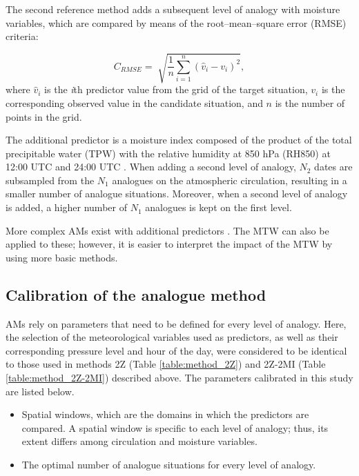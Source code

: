 \documentclass[hess, manuscript]{copernicus}
\begin{document}
	The second reference method \citep[2Z-2MI, Table \ref{table:method_2Z-2MI};][]{Bontron2005} adds a subsequent level of analogy with moisture variables, which are compared by means of the root--mean--square error (RMSE) criteria:
	
	\begin{equation}
	\label{eq:RMSE}
	C_{RMSE}= \sqrt[]{ \frac{1}{n} \sum_{i=1}^{n}(\hat{v}_{i} - v_{i})^{2}} ,
	\end{equation}
	where $\hat{v}_{i}$ is the \textit{i}th predictor value from the grid of the target situation, $v_{i}$ is the corresponding observed value in the candidate situation, and $n$ is the number of points in the grid.
	
	The additional predictor is a moisture index composed of the product of the total precipitable water (TPW) with the relative humidity at 850 hPa (RH850) at 12:00 UTC and 24:00 UTC \citep{Bontron2004}. When adding a second level of analogy, $N_{2}$ dates are subsampled from the $N_{1}$ analogues on the atmospheric circulation, resulting in a smaller number of analogue situations. Moreover, when a second level of analogy is added, a higher number of $N_{1}$ analogues is kept on the first level.
	
	More complex AMs exist with additional predictors \citep[e.g.][]{Horton2012a, BenDaoud2016, Caillouet2016}. The MTW can also be applied to these; however, it is easier to interpret the impact of the MTW by using more basic methods.
	
	
	\subsection{Calibration of the analogue method}
	\label{sec:calibration}
	
	AMs rely on parameters that need to be defined for every level of analogy. Here, the selection of the meteorological variables used as predictors, as well as their corresponding pressure level and hour of the day, were considered to be identical to those used in methods 2Z (Table \ref{table:method_2Z}) and 2Z-2MI (Table \ref{table:method_2Z-2MI}) described above. The parameters calibrated in this study are listed below.
	
	\begin{itemize}
		\item Spatial windows, which are the domains in which the predictors are compared. A spatial window is specific to each level of analogy; thus, its extent differs among circulation and moisture variables.
		\item The optimal number of analogue situations for every level of analogy.
	\end{itemize}
	
\end{document}
